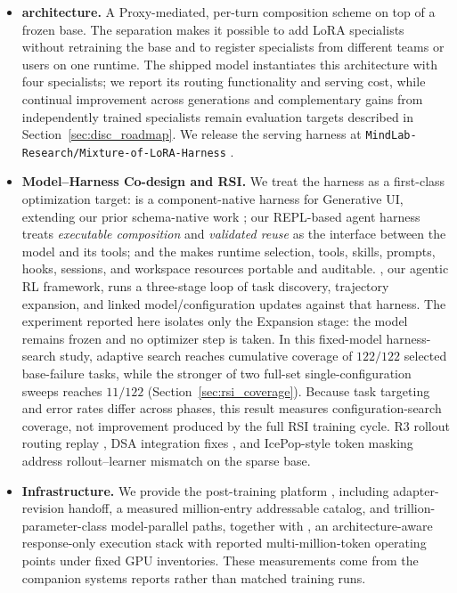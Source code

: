 \begin{itemize}[leftmargin=*]
  \item \textbf{\mol{} architecture.}
  A Proxy-mediated, per-turn composition scheme on top of a frozen base. The
  separation makes it possible to add LoRA specialists without retraining the
  base and to register specialists from different teams or users on one
  runtime. The shipped \venti{} model instantiates this architecture with four
  specialists; we report its routing functionality and serving cost, while
  continual improvement across generations and complementary gains from
  independently trained specialists remain evaluation targets described in
  Section~\ref{sec:disc_roadmap}. We release the serving harness at
  \texttt{MindLab-Research/Mixture-of-LoRA-Harness}
  \citep{mol_harness2026}.

  \item \textbf{Model--Harness Co-design and RSI.}
  We treat the harness as a first-class optimization target:
  \uifora{}
  \citep{ui4a2026} is a component-native harness for Generative UI,
  extending our prior schema-native work
  \citep{macaron_a2ui2026,a2ui_v08}; our REPL-based agent harness
  \citep{wu2026replharnesses} treats \emph{executable composition} and
  \emph{validated reuse} as the interface between the model and its tools; and
  the \hcp{} makes runtime selection, tools, skills, prompts, hooks, sessions,
  and workspace resources portable and auditable. \mindforge{}, our agentic RL
  framework, runs a three-stage loop of task discovery, trajectory expansion,
  and linked model/configuration updates against that harness. The experiment
  reported here isolates only the Expansion stage: the model remains frozen and
  no optimizer step is taken. In this fixed-model harness-search study, adaptive
  search reaches cumulative coverage of $122/122$ selected base-failure tasks,
  while the stronger of two full-set single-configuration sweeps reaches
  $11/122$ (Section~\ref{sec:rsi_coverage}). Because task targeting and error
  rates differ across phases, this result measures configuration-search coverage,
  not improvement produced by the full RSI training cycle.
  R3 rollout routing replay
  \citep{chiang2026routerreplay,r3_moe_router2025}, DSA integration fixes
  \citep{stevenchiang2026supportglm5inmint}, and IcePop-style token masking
  \citep{ling_every_step2025} address rollout--learner mismatch on the sparse
  base.

  \item \textbf{Infrastructure.}
  We provide the \mint{} post-training platform
  \citep{lu2026announcing}, including adapter-revision handoff, a measured
  million-entry addressable catalog, and trillion-parameter-class
  model-parallel paths, together with \longstraw{}
  \citep{zhou2026longstrawlongcontextrl2m}, an architecture-aware
  response-only execution stack with reported multi-million-token operating
  points under fixed GPU inventories. These measurements come from the
  companion systems reports rather than matched \macaron{} training runs.


\end{itemize}
